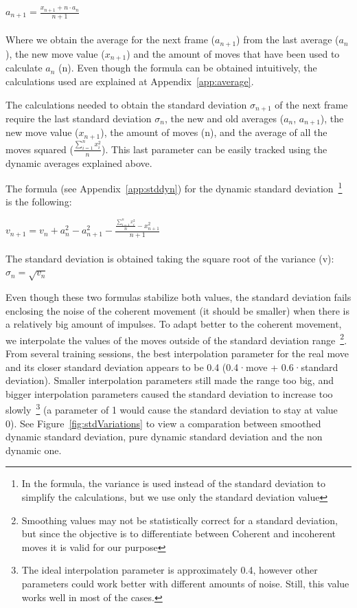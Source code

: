 $ {\displaystyle a_{n+1}=\frac{x_{n+1}+n\cdot a_n}{n+1}} $\\\\

Where we obtain the average for the next frame ($a_{n+1}$) from the last average ($a_{n}$), the new move value ($x_{n+1}$) and the amount of moves that have been used to calculate $a_{n}$ (n). Even though the formula can be obtained intuitively, the calculations used are explained at Appendix~\ref{app:average}.

\vspace{5mm}

The calculations needed to obtain the standard deviation $\sigma_{n+1}$ of the next frame require the last standard deviation $\sigma_{n}$, the new and old averages ($a_{n}$, $a_{n+1}$), the new move value ($x_{n+1}$), the amount of moves (n), and the average of all the moves squared ($\frac{\sum_{i=1}^{n}x_i^2}{n}$). This last parameter can be easily tracked using the dynamic averages explained above. 

The formula (see Appendix~\ref{app:stddyn}) for the dynamic standard deviation~\footnote{In the formula, the variance is used instead of the standard deviation to simplify the calculations, but we use only the standard deviation value} is the following:

\vspace{5mm}

$ {\displaystyle v_{n+1} = v_n + a_n^2-a_{n+1}^2 - \frac{\frac{\sum_{i=1}^{n}x_i^2}{n} - x_{n+1}^2}{n+1} } $\\\\

\noindent
The standard deviation is obtained taking the square root of the variance (v): $\sigma_n=\sqrt{v_n}$

Even though these two formulas stabilize both values, the standard deviation fails enclosing the noise of the coherent movement (it should be smaller) when there is a relatively big amount of impulses. To adapt better to the coherent movement, we interpolate the values of the moves outside of the standard deviation range~\footnote{Smoothing values may not be statistically correct for a standard deviation, but since the objective is to differentiate between Coherent and incoherent moves it is valid for our purpose}. From several training sessions, the best interpolation parameter for the real move and its closer standard deviation appears to be 0.4 (0.4·move + 0.6·standard deviation). Smaller interpolation parameters still made the range too big, and bigger interpolation parameters caused the standard deviation to increase too slowly~\footnote{The ideal interpolation parameter is approximately 0.4, however other parameters could work better with different amounts of noise. Still, this value works well in most of the cases.} (a parameter of 1 would cause the standard deviation to stay at value 0). See Figure~\ref{fig:stdVariations} to view a comparation between smoothed dynamic standard deviation, pure dynamic standard deviation and the non dynamic one.

